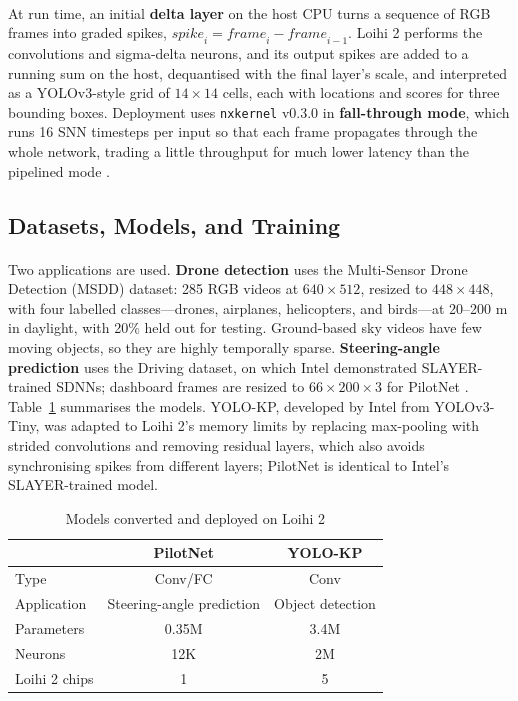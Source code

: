 \documentclass[12pt,a4paper,final]{extreport}
\begin{document}
\paragraph{} At run time, an initial \textbf{delta layer} on the host CPU turns a sequence of RGB frames into graded spikes, $\mathit{spike}_i=\mathit{frame}_i-\mathit{frame}_{i-1}$. Loihi 2 performs the convolutions and sigma-delta neurons, and its output spikes are added to a running sum on the host, dequantised with the final layer's scale, and interpreted as a YOLOv3-style grid of $14\times14$ cells, each with locations and scores for three bounding boxes. Deployment uses \texttt{nxkernel} v0.3.0 in \textbf{fall-through mode}, which runs 16 SNN timesteps per input so that each frame propagates through the whole network, trading a little throughput for much lower latency than the pipelined mode \cite{p4}.

\subsection{Datasets, Models, and Training}

\paragraph{} Two applications are used. \textbf{Drone detection} uses the Multi-Sensor Drone Detection (MSDD) dataset: 285 RGB videos at $640\times512$, resized to $448\times448$, with four labelled classes---drones, airplanes, helicopters, and birds---at 20--200 m in daylight, with 20\% held out for testing. Ground-based sky videos have few moving objects, so they are highly temporally sparse. \textbf{Steering-angle prediction} uses the Driving dataset, on which Intel demonstrated SLAYER-trained SDNNs; dashboard frames are resized to $66\times200\times3$ for PilotNet \cite{p4}. Table~\ref{tab:p4_models} summarises the models. YOLO-KP, developed by Intel from YOLOv3-Tiny, was adapted to Loihi 2's memory limits by replacing max-pooling with strided convolutions and removing residual layers, which also avoids synchronising spikes from different layers; PilotNet is identical to Intel's SLAYER-trained model.

{\renewcommand{\arraystretch}{1.12}
\begin{table}[htbp]
\centering
\caption{Models converted and deployed on Loihi 2 \cite{p4}}\label{tab:p4_models}
\small
\begin{tabular}{|l|c|c|}
\hline
 & \textbf{PilotNet} & \textbf{YOLO-KP} \\ \hline
Type & Conv/FC & Conv \\ \hline
Application & Steering-angle prediction & Object detection \\ \hline
Parameters & 0.35M & 3.4M \\ \hline
Neurons & 12K & 2M \\ \hline
Loihi 2 chips & 1 & 5 \\ \hline
\end{tabular}
\end{table}}
\end{document}

